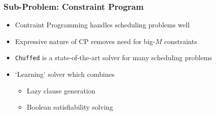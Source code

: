 \documentclass{beamer}
\begin{document}
\begin{frame}
\frametitle{Sub-Problem: Constraint Program}
\begin{itemize}
	\item Contraint Programming handles scheduling problems well\vspace{2mm}\pause
	\item Expressive nature of CP removes need for big-$M$ constraints\vspace{2mm}\pause
	\item {\tt Chuffed} is a state-of-the-art solver for many scheduling problems\vspace{2mm}\pause
	\item `Learning' solver which combines\vspace{2mm}
	\begin{itemize}
		\item Lazy clause generation\vspace{1mm}
		\item Boolean satisfiability solving
	\end{itemize}
\end{itemize}
\end{frame}
\end{document}
